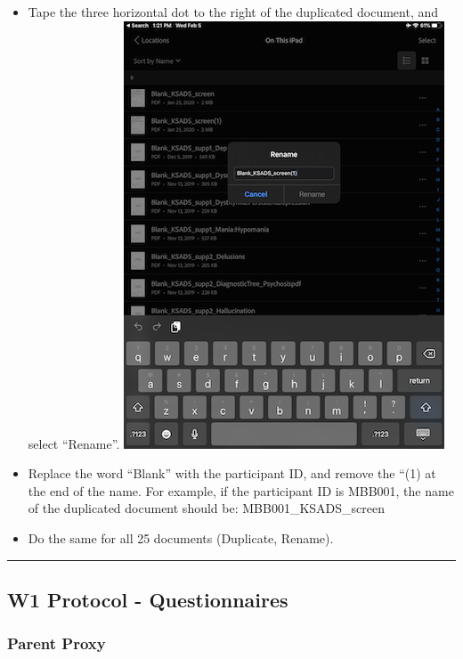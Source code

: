 \documentclass[]{book}
\begin{document}
\begin{itemize}
\begin{itemize}
  \item
    Tape the three horizontal dot to the right of the duplicated document, and select ``Rename''.
    \includegraphics{images/ksads/6.png}
  \item
    Replace the word ``Blank'' with the participant ID, and remove the ``(1) at the end of the name. For example, if the participant ID is MBB001, the name of the duplicated document should be: MBB001\_KSADS\_screen
  \item
    Do the same for all 25 documents (Duplicate, Rename).
  \end{itemize}
\end{itemize}

\begin{center}\rule{0.5\linewidth}{0.5pt}\end{center}

\hypertarget{w1-protocol---questionnaires}{%
\subsection{W1 Protocol - Questionnaires}\label{w1-protocol---questionnaires}}

\hypertarget{parent-proxy-1}{%
\subsubsection{Parent Proxy}\label{parent-proxy-1}}
\end{document}
